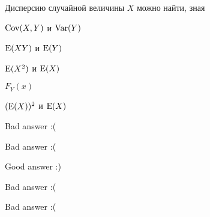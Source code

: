 
\begin{question}
Дисперсию случайной величины \(X\) можно найти, зная
\begin{answerlist}
  \item \(\operatorname{Cov}(X,Y)\) и \(\operatorname{Var}(Y)\)
  \item \(\operatorname{E}(XY)\) и \(\operatorname{E}(Y)\)
  \item \(\operatorname{E}(X^2)\) и \(\operatorname{E}(X)\)
  \item \(F_Y(x)\)
  \item \((\operatorname{E}(X))^2\) и \(\operatorname{E}(X)\)
\end{answerlist}
\end{question}

\begin{solution}
\begin{answerlist}
  \item Bad answer :(
  \item Bad answer :(
  \item Good answer :)
  \item Bad answer :(
  \item Bad answer :(
\end{answerlist}
\end{solution}

